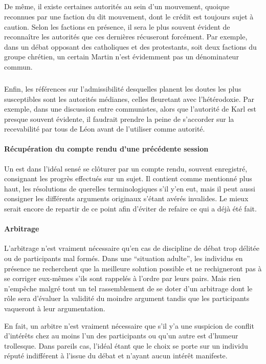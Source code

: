 \subparagraph{}
De même, il existe certaines autorités au sein d’un mouvement, quoique reconnues par une faction du dit mouvement, dont le crédit est toujours sujet à caution. Selon les factions en présence, il sera le plus souvent évident de reconnaître les autorités que ces dernières récuseront forcément. Par exemple, dans un débat opposant des catholiques et des protestants, soit deux factions du groupe chrétien, un certain Martin  n’est évidemment pas un dénominateur commun.

\subparagraph{}
Enfin, les références sur l’admissibilité desquelles planent les doutes les plus susceptibles sont les autorités médianes, celles fleuretant avec l’hétérodoxie. Par exemple, dans une discussion entre communistes, alors que l’autorité de Karl  est presque souvent évidente, il faudrait prendre la peine de s’accorder sur la recevabilité par tous de Léon  avant de l’utiliser comme autorité.

\paragraph{Récupération du compte rendu d’une précédente session} Un \mainabbr{} est dans l’idéal sensé se clôturer par un compte rendu, souvent enregistré, consignant les progrès effectués sur un sujet. Il contient comme mentionné plus haut, les résolutions de querelles terminologiques s’il y’en eut, mais il peut aussi consigner les différents arguments originaux s’étant avérés invalides. Le mieux serait encore de repartir de ce point afin d’éviter de refaire ce qui a déjà été fait.

\paragraph{Arbitrage} L’arbitrage n’est vraiment nécessaire qu’en cas de discipline de débat trop délitée ou de participants mal formés. Dans une \enquote{situation adulte}, les individus en présence ne recherchent que la meilleure solution possible et ne rechigneront pas à se corriger eux-mêmes s’ils sont rappelés à l’ordre par leurs pairs. Mais rien n’empêche malgré tout un tel rassemblement de se doter d’un arbitrage dont le rôle sera d’évaluer la validité du moindre argument tandis que les participants vaqueront à leur argumentation.

En fait, un arbitre n’est vraiment nécessaire que s’il y’a une suspicion de conflit d’intérêts chez au moins l’un des participants ou qu’un autre est d’humeur trollesque. Dans pareils cas, l’idéal étant que le choix se porte sur un individu réputé indifférent à l’issue du débat et n’ayant aucun intérêt manifeste.

